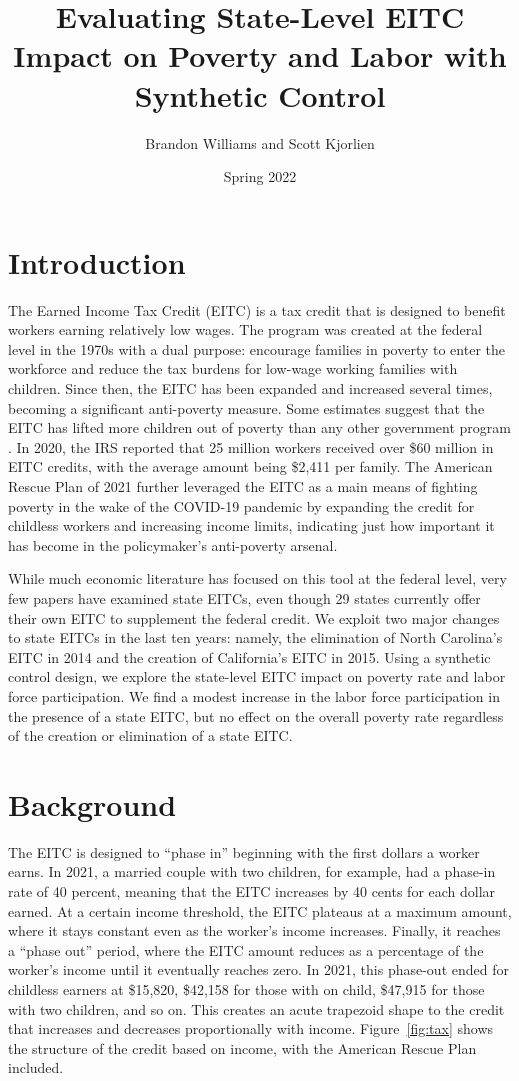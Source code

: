 \documentclass{article}
\author{Brandon Williams and Scott Kjorlien}
\title{Evaluating State-Level EITC Impact on Poverty and Labor with Synthetic Control}
\date{Spring 2022}
\begin{document}
\maketitle

\section{Introduction}

The Earned Income Tax Credit (EITC) is a tax credit that is designed to benefit workers earning relatively low wages. The program was created at the federal level in the 1970s with a dual purpose: encourage families in poverty to enter the workforce and reduce the tax burdens for low-wage working families with children. Since then, the EITC has been expanded and increased several times, becoming a significant anti-poverty measure. Some estimates suggest that the EITC has lifted more children out of poverty than any other government program  \citep{zahradnik2004state}. In 2020, the IRS reported that 25 million workers received over \$60 million in EITC credits, with the average amount being \$2,411 per family. The American Rescue Plan of 2021 further leveraged the EITC as a main means of fighting poverty in the wake of the COVID-19 pandemic by expanding the credit for childless workers and increasing income limits, indicating just how important it has become in the policymaker’s anti-poverty arsenal.

While much economic literature has focused on this tool at the federal level, very few papers have examined state EITCs, even though 29 states currently offer their own EITC to supplement the federal credit. We exploit two major changes to state EITCs in the last ten years: namely, the elimination of North Carolina's EITC in 2014 and the creation of California's EITC in 2015. Using a synthetic control design, we explore the state-level EITC impact on poverty rate and labor force participation. We find a modest increase in the labor force participation in the presence of a state EITC, but no effect on the overall poverty rate regardless of the creation or elimination of a state EITC. 

\section{Background}

The EITC is designed to “phase in” beginning with the first dollars a worker earns. In 2021, a married couple with two children, for example, had a phase-in rate of 40 percent, meaning that the EITC increases by 40 cents for each dollar earned. At a certain income threshold, the EITC plateaus at a maximum amount, where it stays constant even as the worker’s income increases. Finally, it reaches a “phase out” period, where the EITC amount reduces as a percentage of the worker’s income until it eventually reaches zero. In 2021, this phase-out ended for childless earners at \$15,820, \$42,158 for those with on child, \$47,915 for those with two children, and so on. This creates an acute trapezoid shape to the credit that increases and decreases proportionally with income. Figure~\ref{fig:tax} shows the structure of the credit based on income, with the American Rescue Plan included. 
\end{document}
